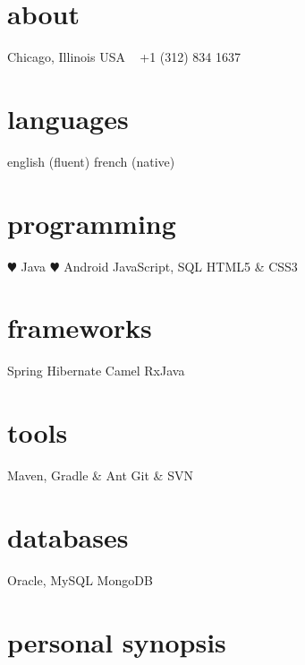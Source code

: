 \documentclass[]{friggeri-cv} %
\begin{document}



\begin{aside} %
\section{about}
{\color{darkgray}Chicago, Illinois
USA
~
+1 (312) 834 1637
~
\section{languages}
english (fluent)
french (native)
\section{programming}
{\color{red} $\varheartsuit$} Java
{\color{red} $\varheartsuit$} Android
JavaScript, SQL
HTML5 \& CSS3
\section{frameworks}
Spring
Hibernate
Camel
RxJava
\section{tools}
Maven, Gradle \& Ant
Git \& SVN
\section{databases}
Oracle, MySQL
MongoDB}
\end{aside}

\section{personal synopsis}
\end{document}
